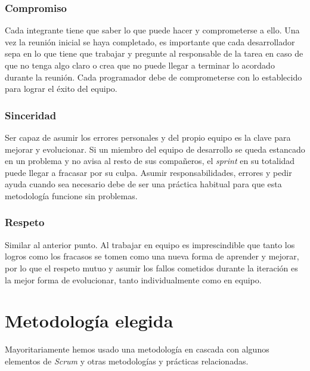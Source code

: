 \subsubsection{Compromiso}

Cada integrante tiene que saber lo que puede hacer y comprometerse a ello. Una vez la reunión inicial se haya completado, es importante que cada desarrollador sepa en lo que tiene que trabajar y pregunte al responsable de la tarea en caso de que no tenga algo claro o crea que no puede llegar a terminar lo acordado durante la reunión. Cada programador debe de comprometerse con lo establecido para lograr el éxito del equipo.

\subsubsection{Sinceridad}

Ser capaz de asumir los errores personales y del propio equipo es la clave para mejorar y evolucionar. Si un miembro del equipo de desarrollo se queda estancado en un problema y no avisa al resto de sus compañeros, el \textit{sprint} en su totalidad puede llegar a fracasar por su culpa. Asumir responsabilidades, errores y pedir ayuda cuando sea necesario debe de ser una práctica habitual para que esta metodología funcione sin problemas.

\subsubsection{Respeto}

Similar al anterior punto. Al trabajar en equipo es imprescindible que tanto los logros como los fracasos se tomen como una nueva forma de aprender y mejorar, por lo que el respeto mutuo y asumir los fallos cometidos durante la iteración es la mejor forma de evolucionar, tanto individualmente como en equipo.

\section{Metodología elegida}
\label{sec:metodologiaelegida}

Mayoritariamente hemos usado una metodología en cascada con algunos elementos de \textit{Scrum} y otras metodologías y prácticas relacionadas.

